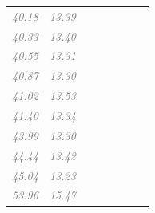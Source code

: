 \documentclass[
  letterpaper,
  DIV=11,
  numbers=noendperiod]{scrartcl}
\newcommand{\cmark}{\ding{51}}
\begin{document}
\begin{longtable}[t]{llccccll}
\textcolor{gray}{\em{40.18}} & \textcolor{gray}{\em{13.39}} & \textcolor{gray}{\em{\cmark}} & \textcolor{gray}{\em{\cmark}} & \textcolor{gray}{\em{\cmark}} & \textcolor{gray}{\em{}} & \textcolor{gray}{\em{}} & \textcolor{gray}{\em{\cmark}}\\
\textcolor{gray}{\em{40.33}} & \textcolor{gray}{\em{13.40}} & \textcolor{gray}{\em{\cmark}} & \textcolor{gray}{\em{\cmark}} & \textcolor{gray}{\em{}} & \textcolor{gray}{\em{\cmark}} & \textcolor{gray}{\em{}} & \textcolor{gray}{\em{\cmark}}\\
\addlinespace
\textcolor{gray}{\em{40.55}} & \textcolor{gray}{\em{13.31}} & \textcolor{gray}{\em{\cmark}} & \textcolor{gray}{\em{\cmark}} & \textcolor{gray}{\em{}} & \textcolor{gray}{\em{\cmark}} & \textcolor{gray}{\em{}} & \textcolor{gray}{\em{}}\\
\textcolor{gray}{\em{40.87}} & \textcolor{gray}{\em{13.30}} & \textcolor{gray}{\em{}} & \textcolor{gray}{\em{\cmark}} & \textcolor{gray}{\em{}} & \textcolor{gray}{\em{}} & \textcolor{gray}{\em{}} & \textcolor{gray}{\em{}}\\
\textcolor{gray}{\em{41.02}} & \textcolor{gray}{\em{13.53}} & \textcolor{gray}{\em{}} & \textcolor{gray}{\em{\cmark}} & \textcolor{gray}{\em{}} & \textcolor{gray}{\em{\cmark}} & \textcolor{gray}{\em{}} & \textcolor{gray}{\em{\cmark}}\\
\textcolor{gray}{\em{41.40}} & \textcolor{gray}{\em{13.34}} & \textcolor{gray}{\em{}} & \textcolor{gray}{\em{\cmark}} & \textcolor{gray}{\em{\cmark}} & \textcolor{gray}{\em{\cmark}} & \textcolor{gray}{\em{}} & \textcolor{gray}{\em{}}\\
\textcolor{gray}{\em{43.99}} & \textcolor{gray}{\em{13.30}} & \textcolor{gray}{\em{\cmark}} & \textcolor{gray}{\em{\cmark}} & \textcolor{gray}{\em{\cmark}} & \textcolor{gray}{\em{\cmark}} & \textcolor{gray}{\em{}} & \textcolor{gray}{\em{}}\\
\addlinespace
\textcolor{gray}{\em{44.44}} & \textcolor{gray}{\em{13.42}} & \textcolor{gray}{\em{}} & \textcolor{gray}{\em{\cmark}} & \textcolor{gray}{\em{}} & \textcolor{gray}{\em{}} & \textcolor{gray}{\em{}} & \textcolor{gray}{\em{\cmark}}\\
\textcolor{gray}{\em{45.04}} & \textcolor{gray}{\em{13.23}} & \textcolor{gray}{\em{}} & \textcolor{gray}{\em{\cmark}} & \textcolor{gray}{\em{}} & \textcolor{gray}{\em{\cmark}} & \textcolor{gray}{\em{}} & \textcolor{gray}{\em{}}\\
\textcolor{gray}{\em{53.96}} & \textcolor{gray}{\em{15.47}} & \textcolor{gray}{\em{}} & \textcolor{gray}{\em{}} & \textcolor{gray}{\em{\cmark}} & \textcolor{gray}{\em{\cmark}} & \textcolor{gray}{\em{\cmark}} & \textcolor{gray}{\em{}}\\

\end{longtable}
\end{document}
